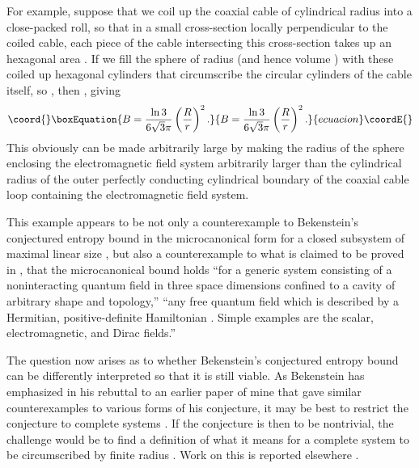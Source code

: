 \documentclass[a4paper,12pt]{article}
\begin{document}
	For example, suppose that we coil up
the coaxial cable of cylindrical radius \coordHE{}
into a close-packed roll, so that in a small cross-section
locally perpendicular to the coiled cable, each piece of the
cable intersecting this cross-section takes up
an hexagonal area \coordHE{}.
If we fill the sphere of radius \coordHE{}
(and hence volume \coordHE{})
with these coiled up hexagonal cylinders
that circumscribe the circular cylinders
of the cable itself, so \coordHE{},
then \coordHE{}, giving
 \begin{equation}\coord{}\boxEquation{
 B = {\ln{3}\over 6\sqrt{3} \pi} \left({R\over r}\right)^2.
 \label{eq:18}
 }{
 B = {\ln{3}\over 6\sqrt{3} \pi} \left({R\over r}\right)^2.
 }{ecuacion}\coordE{}\end{equation}
This obviously can be made arbitrarily large
by making the radius \coordHE{} of the sphere
enclosing the electromagnetic field system
arbitrarily larger than the cylindrical
radius \coordHE{} of the outer perfectly
conducting cylindrical boundary
of the coaxial cable loop containing the
electromagnetic field system.

	This example appears to be not only
a counterexample to
Bekenstein's conjectured entropy bound
\coordHE{}
in the microcanonical form 
for a closed subsystem of maximal linear size \coordHE{},
but also a counterexample to what is claimed
to be proved in
\cite{SB1},
that the microcanonical bound holds
``for a generic system consisting of
a noninteracting quantum field
in three space dimensions confined to a cavity
of arbitrary shape and topology,''
``any free quantum field
which is described by a Hermitian,
positive-definite Hamiltonian \coordHE{}.
Simple examples are the scalar,
electromagnetic, and Dirac fields.''

	The question now arises as to
whether Bekenstein's conjectured entropy
bound can be differently interpreted
so that it is still viable.
As Bekenstein has emphasized
\cite{Bek9}
in his rebuttal to an earlier paper
of mine
\cite{Page2}
that gave similar counterexamples
to various forms of his conjecture,
it may be best to restrict the conjecture
to complete systems
\cite{Bek3,Bek6}.
If the conjecture is then to be nontrivial,
the challenge would be to find
a definition of what it means for
a complete system to be circumscribed
by finite radius \coordHE{}.  Work on this is
reported elsewhere
\cite{Page3}.
\end{document}
